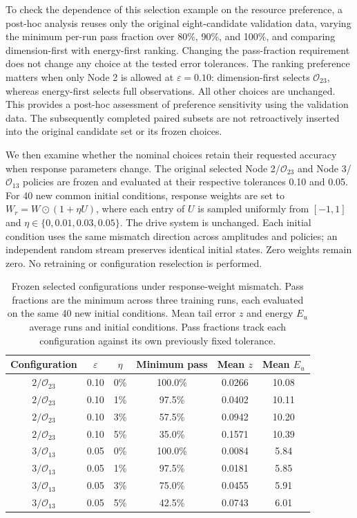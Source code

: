 To check the dependence of this selection example on the resource preference, a post-hoc analysis reuses only the original eight-candidate validation data, varying the minimum per-run pass fraction over 80\%, 90\%, and 100\%, and comparing dimension-first with energy-first ranking. Changing the pass-fraction requirement does not change any choice at the tested error tolerances. The ranking preference matters when only Node 2 is allowed at $\varepsilon=0.10$: dimension-first selects $\mathcal O_{23}$, whereas energy-first selects full observations. All other choices are unchanged. This provides a post-hoc assessment of preference sensitivity using the validation data. The subsequently completed paired subsets are not retroactively inserted into the original candidate set or its frozen choices.

We then examine whether the nominal choices retain their requested accuracy when response parameters change. The original selected Node 2/$\mathcal O_{23}$ and Node 3/$\mathcal O_{13}$ policies are frozen and evaluated at their respective tolerances 0.10 and 0.05. For 40 new common initial conditions, response weights are set to $W_r=W\odot(1+\eta U)$, where each entry of $U$ is sampled uniformly from $[-1,1]$ and $\eta\in\{0,0.01,0.03,0.05\}$. The drive system is unchanged. Each initial condition uses the same mismatch direction across amplitudes and policies; an independent random stream preserves identical initial states. Zero weights remain zero. No retraining or configuration reselection is performed.

\begin{table}[pos=!t,width=\textwidth]
\centering
\caption{Frozen selected configurations under response-weight mismatch. Pass fractions are the minimum across three training runs, each evaluated on the same 40 new initial conditions. Mean tail error $z$ and energy $E_u$ average runs and initial conditions. Pass fractions track each configuration against its own previously fixed tolerance.}
\label{tab:configuration_transfer}
\small
\begin{tabular}{cccccc}
\toprule
Configuration & $\varepsilon$ & $\eta$ & Minimum pass & Mean $z$ & Mean $E_u$\\
\midrule
$2/\mathcal O_{23}$ & 0.10 & 0\% & 100.0\% & 0.0266 & 10.08\\
$2/\mathcal O_{23}$ & 0.10 & 1\% & 97.5\% & 0.0402 & 10.11\\
$2/\mathcal O_{23}$ & 0.10 & 3\% & 57.5\% & 0.0942 & 10.20\\
$2/\mathcal O_{23}$ & 0.10 & 5\% & 35.0\% & 0.1571 & 10.39\\
$3/\mathcal O_{13}$ & 0.05 & 0\% & 100.0\% & 0.0084 & 5.84\\
$3/\mathcal O_{13}$ & 0.05 & 1\% & 97.5\% & 0.0181 & 5.85\\
$3/\mathcal O_{13}$ & 0.05 & 3\% & 75.0\% & 0.0455 & 5.91\\
$3/\mathcal O_{13}$ & 0.05 & 5\% & 42.5\% & 0.0743 & 6.01\\
\bottomrule
\end{tabular}
\end{table}

